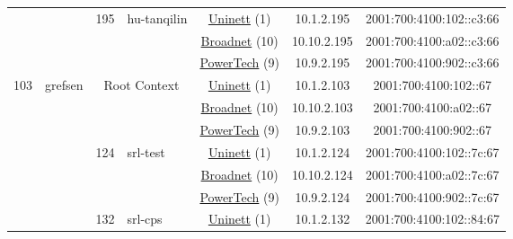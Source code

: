 \begin{small}
\begin{center}
\begin{longtable}{|c|c|c|c|c|c|c|c|}
  &  & \multirow{3}{*}{\tiny{195}} & \multicolumn{1}{|l|}{\multirow{3}{*}{\tiny{hu-tanqilin}}} & \multicolumn{2}{|c|}{\tiny{\href{https://www.uninett.no}{Uninett} (1)}} & \tiny{10.1.2.195} & \tiny{2001:700:4100:102::c3:66} \\* \cline{5-5}\cline{6-6}\cline{7-7}\cline{8-8}
  &  &  &  & \multicolumn{2}{|c|}{\tiny{\href{https://www.broadnet.no}{Broadnet} (10)}} & \tiny{10.10.2.195} & \tiny{2001:700:4100:a02::c3:66} \\* \cline{5-5}\cline{6-6}\cline{7-7}\cline{8-8}
  &  &  &  & \multicolumn{2}{|c|}{\tiny{\href{http://www.powertech.no}{PowerTech} (9)}} & \tiny{10.9.2.195} & \tiny{2001:700:4100:902::c3:66} \\ \hline
 \multirow{36}{*}{\tiny{103}} & \multicolumn{1}{|l|}{\multirow{36}{*}{\tiny{grefsen}}} & \multicolumn{2}{|c|}{\multirow{3}{*}{\tiny{Root Context}}} & \multicolumn{2}{|c|}{\tiny{\href{https://www.uninett.no}{Uninett} (1)}} & \tiny{10.1.2.103} & \tiny{2001:700:4100:102::67} \\* \cline{5-5}\cline{6-6}\cline{7-7}\cline{8-8}
  &  & \multicolumn{2}{|c|}{} & \multicolumn{2}{|c|}{\tiny{\href{https://www.broadnet.no}{Broadnet} (10)}} & \tiny{10.10.2.103} & \tiny{2001:700:4100:a02::67} \\* \cline{5-5}\cline{6-6}\cline{7-7}\cline{8-8}
  &  & \multicolumn{2}{|c|}{} & \multicolumn{2}{|c|}{\tiny{\href{http://www.powertech.no}{PowerTech} (9)}} & \tiny{10.9.2.103} & \tiny{2001:700:4100:902::67} \\* \cline{3-3}\cline{4-4}\cline{5-5}\cline{6-6}\cline{7-7}\cline{8-8}
  &  & \multirow{3}{*}{\tiny{124}} & \multicolumn{1}{|l|}{\multirow{3}{*}{\tiny{srl-test}}} & \multicolumn{2}{|c|}{\tiny{\href{https://www.uninett.no}{Uninett} (1)}} & \tiny{10.1.2.124} & \tiny{2001:700:4100:102::7c:67} \\* \cline{5-5}\cline{6-6}\cline{7-7}\cline{8-8}
  &  &  &  & \multicolumn{2}{|c|}{\tiny{\href{https://www.broadnet.no}{Broadnet} (10)}} & \tiny{10.10.2.124} & \tiny{2001:700:4100:a02::7c:67} \\* \cline{5-5}\cline{6-6}\cline{7-7}\cline{8-8}
  &  &  &  & \multicolumn{2}{|c|}{\tiny{\href{http://www.powertech.no}{PowerTech} (9)}} & \tiny{10.9.2.124} & \tiny{2001:700:4100:902::7c:67} \\* \cline{3-3}\cline{4-4}\cline{5-5}\cline{6-6}\cline{7-7}\cline{8-8}
  &  & \multirow{3}{*}{\tiny{132}} & \multicolumn{1}{|l|}{\multirow{3}{*}{\tiny{srl-cps}}} & \multicolumn{2}{|c|}{\tiny{\href{https://www.uninett.no}{Uninett} (1)}} & \tiny{10.1.2.132} & \tiny{2001:700:4100:102::84:67} \\* \cline{5-5}\cline{6-6}\cline{7-7}\cline{8-8}

\end{longtable}
\end{center}
\end{small}
